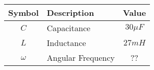 
    \begin{tabular}{|c|l|c|}
        \hline
        \textbf{Symbol} & \textbf{Description} & \textbf{Value} \\
        \hline
        \(C\) & Capacitance & \(30 \mu F\) \\
        \(L\) & Inductance & \(27 mH\) \\
        \(\omega\) & Angular Frequency & ??\\
        \hline
    \end{tabular}
